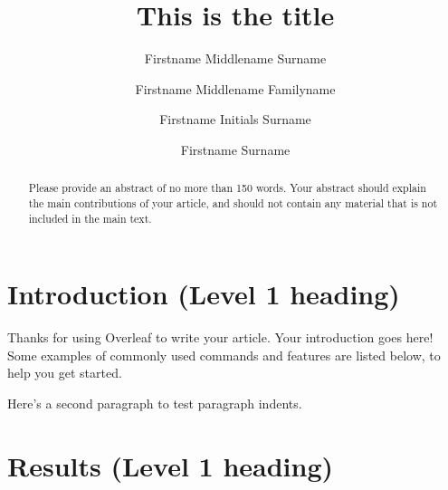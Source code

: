 \documentclass[9pt,lineno]{elife}
\title{This is the title}
\author[1*]{Firstname Middlename Surname}
\author[1,2\authfn{1}\authfn{3}]{Firstname Middlename Familyname}
\author[2\authfn{1}\authfn{4}]{Firstname Initials Surname}
\author[2*]{Firstname Surname}
\affil[1]{Institution 1}
\affil[2]{Institution 2}
\begin{document}
\maketitle

\begin{abstract}
Please provide an abstract of no more than 150 words. Your abstract should explain the main contributions of your article, and should not contain any material that is not included in the main text.
\end{abstract}


\section{Introduction (Level 1 heading)}

Thanks for using Overleaf to write your article. Your introduction goes here! Some examples of commonly used commands and features are listed below, to help you get started.

Here's a second paragraph to test paragraph indents. \lipsum[1]

\section{Results (Level 1 heading)}

\lipsum[2-3]
\end{document}
